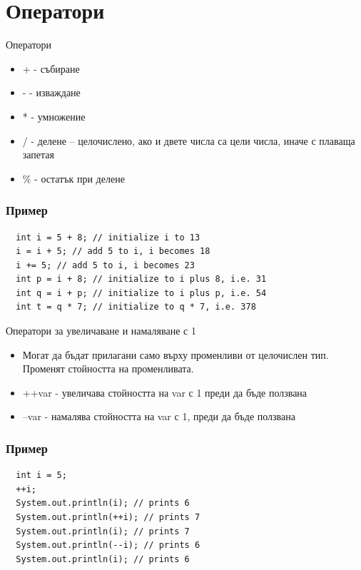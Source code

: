 \documentclass{beamer}
\begin{document}
\section{Оператори}
\begin{frame}{Оператори}
  \transdissolve
  \begin{itemize}
  \item + - събиране
  \item - - изваждане
  \item * - умножение
  \item / - делене – целочислено, ако и двете
    числа са цели числа, иначе с плаваща
    запетая
  \item \% - остатък при делене
  \end{itemize}
\end{frame}

\begin{frame}[fragile]
  \frametitle{Пример}
  \transdissolve
\begin{lstlisting}
  int i = 5 + 8; // initialize i to 13
  i = i + 5; // add 5 to i, i becomes 18
  i += 5; // add 5 to i, i becomes 23
  int p = i + 8; // initialize to i plus 8, i.e. 31
  int q = i + p; // initialize to i plus p, i.e. 54
  int t = q * 7; // initialize to q * 7, i.e. 378
\end{lstlisting}
\end{frame}

\begin{frame}{Оператори за увеличаване и намаляване с 1}
  \transdissolve
  \begin{itemize}
  \item Могат да бъдат прилагани само върху
    променливи от целочислен тип.
    Променят стойността на променливата.

   \item ++var - увеличава стойността на var с 1
    преди да бъде ползвана

   \item --var - намалява стойността на var с 1,
    преди да бъде ползвана
  \end{itemize}
\end{frame}

\begin{frame}[fragile]
  \frametitle{Пример}
  \transdissolve
\begin{lstlisting}
  int i = 5;
  ++i;
  System.out.println(i); // prints 6
  System.out.println(++i); // prints 7
  System.out.println(i); // prints 7
  System.out.println(--i); // prints 6
  System.out.println(i); // prints 6
\end{lstlisting}
\end{frame}
\end{document}

